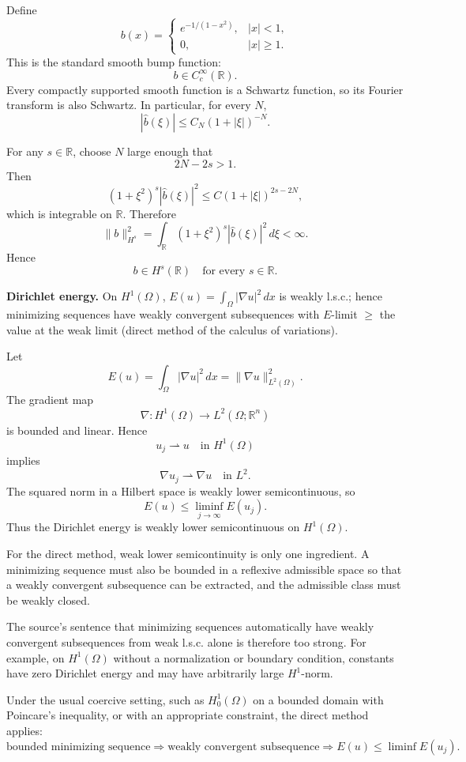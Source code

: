 \begin{solution}
Define
\[
b(x)
=
\begin{cases}
e^{-1/(1-x^2)},&|x|<1,\\
0,&|x|\ge1.
\end{cases}
\]
This is the standard smooth bump function:
\[
b\in C_c^\infty(\mathbb R).
\]
Every compactly supported smooth function is a Schwartz function, so its Fourier transform is
also Schwartz. In particular, for every \(N\),
\[
|\widehat b(\xi)|
\le
C_N(1+|\xi|)^{-N}.
\]

For any \(s\in\mathbb R\), choose \(N\) large enough that
\[
2N-2s>1.
\]
Then
\[
(1+\xi^2)^s|\widehat b(\xi)|^2
\le
C(1+|\xi|)^{2s-2N},
\]
which is integrable on \(\mathbb R\). Therefore
\[
\|b\|_{H^s}^2
=
\int_{\mathbb R}
(1+\xi^2)^s
|\widehat b(\xi)|^2\,d\xi
<
\infty.
\]
Hence
\[
\boxed{
b\in H^s(\mathbb R)
\quad\text{for every }s\in\mathbb R.
}
\]
\end{solution}


\begin{problem}[CP-II-0261]
\label{prob:cp-ii-0261}
\textbf{Dirichlet energy.} On $H^1(\Omega)$,
		$E(u)=\int_\Omega |\nabla u|^2\,dx$ is weakly l.s.c.; hence minimizing sequences
		have weakly convergent subsequences with $E$-limit $\ge$ the value at the weak limit
		(direct method of the calculus of variations).
\end{problem}

\begin{solution}
Let
\[
E(u)
=
\int_\Omega|\nabla u|^2\,dx
=
\|\nabla u\|_{L^2(\Omega)}^2.
\]
The gradient map
\[
\nabla:H^1(\Omega)\to L^2(\Omega;\mathbb R^n)
\]
is bounded and linear. Hence
\[
u_j\rightharpoonup u
\quad\text{in }H^1(\Omega)
\]
implies
\[
\nabla u_j\rightharpoonup\nabla u
\quad\text{in }L^2.
\]
The squared norm in a Hilbert space is weakly lower semicontinuous, so
\[
\boxed{
E(u)
\le
\liminf_{j\to\infty}E(u_j).
}
\]
Thus the Dirichlet energy is weakly lower semicontinuous on \(H^1(\Omega)\).

For the direct method, weak lower semicontinuity is only one ingredient. A minimizing sequence
must also be bounded in a reflexive admissible space so that a weakly convergent subsequence
can be extracted, and the admissible class must be weakly closed.

The source's sentence that minimizing sequences automatically have weakly convergent
subsequences from weak l.s.c. alone is therefore too strong. For example, on \(H^1(\Omega)\)
without a normalization or boundary condition, constants have zero Dirichlet energy and may
have arbitrarily large \(H^1\)-norm.

Under the usual coercive setting, such as \(H_0^1(\Omega)\) on a bounded domain with
Poincare's inequality, or with an appropriate constraint, the direct method applies:
\[
\boxed{
\text{bounded minimizing sequence}
\Rightarrow
\text{weakly convergent subsequence}
\Rightarrow
E(u)\le\liminf E(u_j).
}
\]
\end{solution}


